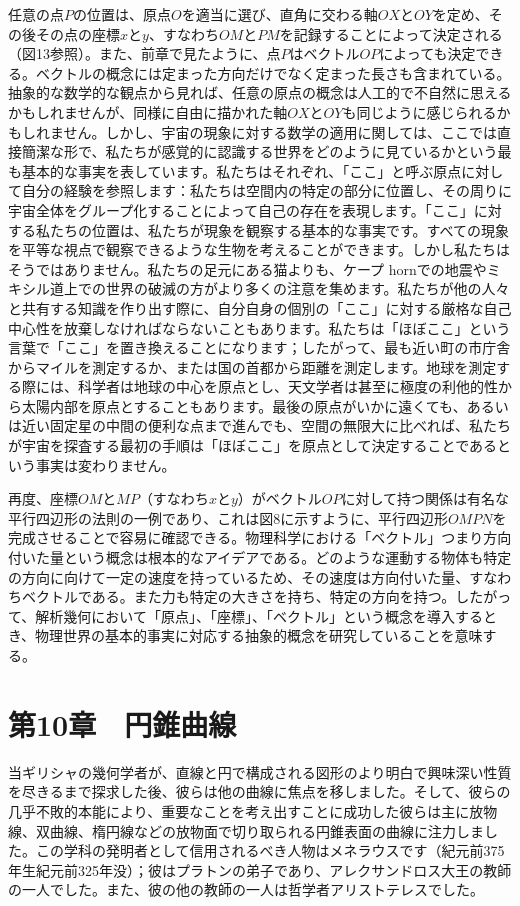 \documentclass[a4paper,11pt,openany]{ltjsbook}
\begin{document}
任意の点$P$の位置は、原点$O$を適当に選び、直角に交わる軸$OX$と$OY$を定め、その後その点の座標$x$と$y$、すなわち$OM$と$PM$を記録することによって決定される（図13参照）。また、前章で見たように、点$P$はベクトル$OP$によっても決定できる。ベクトルの概念には定まった方向だけでなく定まった長さも含まれている。抽象的な数学的な観点から見れば、任意の原点の概念は人工的で不自然に思えるかもしれませんが、同様に自由に描かれた軸$OX$と$OY$も同じように感じられるかもしれません。しかし、宇宙の現象に対する数学の適用に関しては、ここでは直接簡潔な形で、私たちが感覚的に認識する世界をどのように見ているかという最も基本的な事実を表しています。私たちはそれぞれ、「ここ」と呼ぶ原点に対して自分の経験を参照します：私たちは空間内の特定の部分に位置し、その周りに宇宙全体をグループ化することによって自己の存在を表現します。「ここ」に対する私たちの位置は、私たちが現象を観察する基本的な事実です。すべての現象を平等な視点で観察できるような生物を考えることができます。しかし私たちはそうではありません。私たちの足元にある猫よりも、ケープ hornでの地震やミキシル道上での世界の破滅の方がより多くの注意を集めます。私たちが他の人々と共有する知識を作り出す際に、自分自身の個別の「ここ」に対する厳格な自己中心性を放棄しなければならないこともあります。私たちは「ほぼここ」という言葉で「ここ」を置き換えることになります；したがって、最も近い町の市庁舎からマイルを測定するか、または国の首都から距離を測定します。地球を測定する際には、科学者は地球の中心を原点とし、天文学者は甚至に極度の利他的性から太陽内部を原点とすることもあります。最後の原点がいかに遠くても、あるいは近い固定星の中間の便利な点まで進んでも、空間の無限大に比べれば、私たちが宇宙を探査する最初の手順は「ほぼここ」を原点として決定することであるという事実は変わりません。

再度、座標$OM$と$MP$（すなわち$x$と$y$）がベクトル$OP$に対して持つ関係は有名な平行四辺形の法則の一例であり、これは図8に示すように、平行四辺形$OMPN$を完成させることで容易に確認できる。物理科学における「ベクトル」つまり方向付いた量という概念は根本的なアイデアである。どのような運動する物体も特定の方向に向けて一定の速度を持っているため、その速度は方向付いた量、すなわちベクトルである。また力も特定の大きさを持ち、特定の方向を持つ。したがって、解析幾何において「原点」、「座標」、「ベクトル」という概念を導入するとき、物理世界の基本的事実に対応する抽象的概念を研究していることを意味する。

\chapter{第10章　円錐曲線}

当ギリシャの幾何学者が、直線と円で構成される図形のより明白で興味深い性質を尽きるまで探求した後、彼らは他の曲線に焦点を移しました。そして、彼らの几乎不敗的本能により、重要なことを考え出すことに成功した彼らは主に放物線、双曲線、楕円線などの放物面で切り取られる円錐表面の曲線に注力しました。この学科の発明者として信用されるべき人物はメネラウスです（紀元前375年生紀元前325年没）；彼はプラトンの弟子であり、アレクサンドロス大王の教師の一人でした。また、彼の他の教師の一人は哲学者アリストテレスでした。
\end{document}

